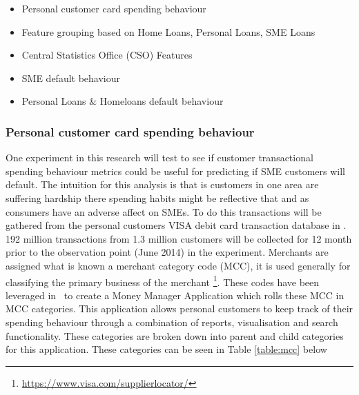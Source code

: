 \begin{itemize}
	\item Personal customer card spending behaviour
	\item Feature grouping based on Home Loans, Personal Loans, SME Loans
	\item Central Statistics Office (CSO) Features
	\item SME default behaviour
	\item Personal Loans \& Homeloans default behaviour
\end{itemize}


\subsubsection{Personal customer card spending behaviour}
One experiment in this research will test to see if customer transactional spending behaviour metrics could be useful for predicting if SME customers will default. The intuition for this analysis is that is customers in one area are suffering hardship there spending habits might be reflective that and as consumers have an adverse affect on SMEs. To do this transactions will be gathered from the personal customers VISA debit card transaction database in \subjectname. 192 million transactions from 1.3 million customers  will be collected for 12 month prior to the observation point (June 2014) in the experiment. 
Merchants are assigned what is known a merchant category code (MCC), it is used generally for classifying the primary business of the merchant \footnote{\url{https://www.visa.com/supplierlocator/}}. These codes have been leveraged in \subjectname\ to create a Money Manager Application which rolls these MCC in MCC categories. This application allows personal customers to keep track of their spending behaviour through a combination of reports, visualisation and search functionality. These categories are broken down into parent and child categories for this application. These categories can be seen in Table \ref{table:mcc} below

